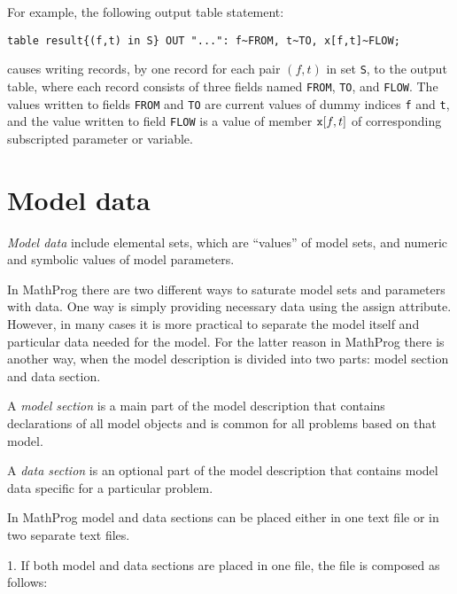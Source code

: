 \documentclass[11pt]{report}
\begin{document}
For example, the following output table statement:

\noindent\hfil
\verb|table result{(f,t) in S} OUT "...": f~FROM, t~TO, x[f,t]~FLOW;|

\noindent
causes writing records, by one record for each pair $(f,t)$ in set
{\tt S}, to the output table, where each record consists of three
fields named {\tt FROM}, {\tt TO}, and {\tt FLOW}. The values written
to fields {\tt FROM} and {\tt TO} are current values of dummy indices
{\tt f} and {\tt t}, and the value written to field {\tt FLOW} is
a value of member ${\tt x}[f,t]$ of corresponding subscripted parameter
or variable.


\chapter{Model data}

{\it Model data} include elemental sets, which are ``values'' of model
sets, and numeric and symbolic values of model parameters.

In MathProg there are two different ways to saturate model sets and
parameters with data. One way is simply providing necessary data using
the assign attribute. However, in many cases it is more practical to
separate the model itself and particular data needed for the model. For
the latter reason in MathProg there is another way, when the model
description is divided into two parts: model section and data section.

A {\it model section} is a main part of the model description that
contains declarations of all model objects and is common for all
problems based on that model.

A {\it data section} is an optional part of the model description that
contains model data specific for a particular problem.

In MathProg model and data sections can be placed either in one text
file or in two separate text files.

1. If both model and data sections are placed in one file, the file is
composed as follows:

\bigskip

\noindent\hfil
{}
\end{document}
